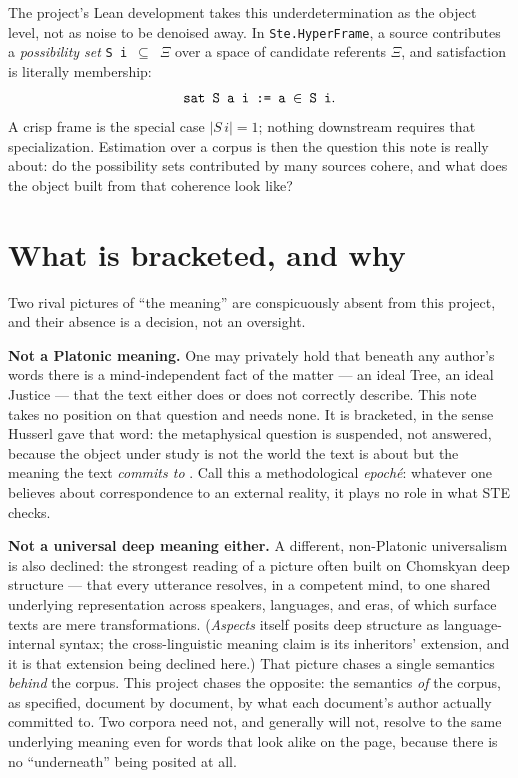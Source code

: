 \documentclass[11pt]{article}
\newcommand{\code}[1]{\texttt{#1}}
\begin{document}
The project's Lean development takes this underdetermination as the
object level, not as noise to be denoised away. In
\code{Ste.HyperFrame}, a source contributes a \emph{possibility set}
\code{S i \ensuremath{\subseteq} \ensuremath{\Xi}} over a space of
candidate referents \code{\ensuremath{\Xi}}, and satisfaction is
literally membership:
\[
  \code{sat S a i := a \ensuremath{\in} S i}.
\]
A crisp frame is the special case $|S\,i| = 1$; nothing downstream
requires that specialization. Estimation over a corpus is then the
question this note is really about: do the possibility sets contributed
by many sources cohere, and what does the object built from that
coherence look like?

\section{What is bracketed, and why}
\label{sec:bracket}

Two rival pictures of ``the meaning'' are conspicuously absent from
this project, and their absence is a decision, not an oversight.

\textbf{Not a Platonic meaning.} One may privately hold that beneath
any author's words there is a mind-independent fact of the matter ---
an ideal Tree, an ideal Justice --- that the text either does or does
not correctly describe. This note takes no position on that question
and needs none. It is bracketed, in the sense Husserl gave that word:
the metaphysical question is suspended, not answered, because the
object under study is not the world the text is about but the meaning
the text \emph{commits to} \citep{husserl1913ideas}. Call this a
methodological \emph{epoch\'e}: whatever one believes about
correspondence to an external reality, it plays no role in what STE
checks.

\textbf{Not a universal deep meaning either.} A different,
non-Platonic universalism is also declined: the strongest reading of a
picture often built on Chomskyan deep structure
\citep{chomsky1965aspects} --- that every utterance resolves, in a
competent mind, to one shared underlying representation across
speakers, languages, and eras, of which surface texts are mere
transformations. (\emph{Aspects} itself posits deep structure as
language-internal syntax; the cross-linguistic meaning claim is its
inheritors' extension, and it is that extension being declined
here.) That picture chases a single semantics
\emph{behind} the corpus. This project chases the opposite: the
semantics \emph{of} the corpus, as specified, document by document, by
what each document's author actually committed to. Two corpora need
not, and generally will not, resolve to the same underlying meaning
even for words that look alike on the page, because there is no
``underneath'' being posited at all.
\end{document}
